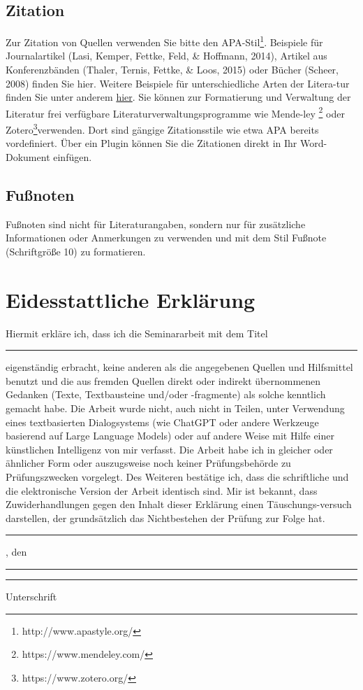 \documentclass[a4paper,11pt]{article}
\begin{document}
\subsection{Zitation}
Zur Zitation von Quellen verwenden Sie bitte den APA-Stil\footnote{http://www.apastyle.org/}. Beispiele für Journalartikel (Lasi, Kemper, Fettke, Feld, \& Hoffmann, 2014), Artikel aus Konferenzbänden (Thaler, Ternis, Fettke, \& Loos, 2015) oder Bücher (Scheer, 2008) finden Sie hier. Weitere Beispiele für unterschiedliche Arten der Litera-tur finden Sie unter anderem \href{https://onlinekurslabor.phil.uni-augsburg.de/course/text/3880/3998}{hier}. Sie können zur Formatierung und Verwaltung der Literatur frei verfügbare Literaturverwaltungsprogramme wie Mende-ley \footnote{https://www.mendeley.com/} oder Zotero\footnote{https://www.zotero.org/}verwenden. Dort sind gängige Zitationsstile wie etwa APA bereits vordefiniert. Über ein Plugin können Sie die Zitationen direkt in Ihr Word-Dokument einfügen. 

\subsection{Fußnoten}
Fußnoten sind nicht für Literaturangaben, sondern nur für zusätzliche Informationen oder Anmerkungen zu verwenden und mit dem Stil \glqq Fußnote\grqq{} (Schriftgröße 10) zu formatieren.


\newpage
\nocite{inproceedings}
\nocite{Scheer1995}
\nocite{Lasi2014}


\setcounter{page}{5} %
\renewcommand\refname{Literaturverzeichnis}

\renewcommand*{\mkbibnamefamily}[1]{\textsc{#1}}
\printbibliography
\newpage 
\section*{Eidesstattliche Erklärung}
Hiermit erkläre ich, dass ich die Seminararbeit mit dem Titel

\noindent \rule{\textwidth}{1pt}
eigenständig erbracht, keine anderen als die angegebenen Quellen und Hilfsmittel benutzt und die
aus fremden Quellen direkt oder indirekt übernommenen Gedanken (Texte, Textbausteine und/oder
-fragmente) als solche kenntlich gemacht habe. Die Arbeit wurde nicht, auch nicht in Teilen, unter
Verwendung eines textbasierten Dialogsystems (wie ChatGPT oder andere Werkzeuge basierend auf Large Language Models) oder auf andere Weise mit Hilfe einer
künstlichen Intelligenz von mir verfasst. Die Arbeit habe ich in gleicher oder ähnlicher Form oder
auszugsweise noch keiner Prüfungsbehörde zu Prüfungszwecken vorgelegt.
Des Weiteren bestätige ich, dass die schriftliche und die elektronische Version der Arbeit identisch
sind.
Mir ist bekannt, dass Zuwiderhandlungen gegen den Inhalt dieser Erklärung einen
Täuschungs-versuch darstellen, der grundsätzlich das Nichtbestehen der Prüfung zur Folge hat.

\leavevmode\newline

\noindent \rule{5cm}{1pt}, den \rule{5cm}{1pt}
\leavevmode\newline\newline
\leavevmode\newline
\noindent \rule{10cm}{1pt}


\noindent Unterschrift
\end{document}
